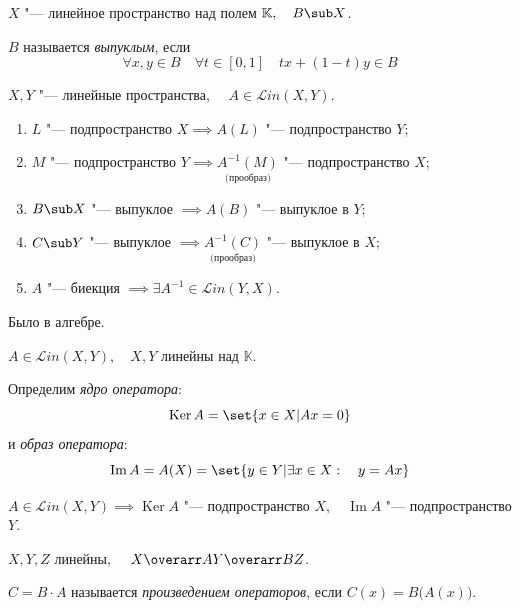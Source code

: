 \begin{definition}
	$ X $ "--- линейное пространство над полем $ \mathbb K, \quad B \sub X $.

	$ B $ называется \emph{выпуклым}, если
	$$ \forall x, y \in B \quad \forall t \in [0, 1] \quad tx + (1 - t)y \in B $$
\end{definition}

\begin{theorem}
	$ X, Y $ "--- линейные пространства, $ \quad A \in \mathscr Lin(X, Y) $.

	\begin{enumerate}
		\item $ L $ "--- подпространство $ X \implies A(L) $ "--- подпространство $ Y $;
		\item $ M $ "--- подпространство $ Y \implies
			\underset{\text{(прообраз)}}{A^{-1}(M)} $ "--- подпространство $ X $;
		\item $ B \sub X $ "--- выпуклое $ \implies A(B) $ "--- выпуклое в $ Y $;
		\item $ C \sub Y $ "--- выпуклое $ \implies \underset{\text{(прообраз)}}{A^{-1}(C)} $ "--- выпуклое в $ X $;
		\item $ A $ "--- биекция $ \implies \exists A^{-1} \in \mathscr Lin(Y, X) $.
	\end{enumerate}
\end{theorem}

\begin{noproof}
	Было в алгебре.
\end{noproof}

\begin{definition}
	$ A \in \mathscr Lin(X, Y), \quad X, Y $ линейны над $ \mathbb K $.

	Определим \emph{ядро оператора}:
	$$ \operatorname{Ker} A = \set{x \in X | Ax = 0} $$
	и \emph{образ оператора}:
	$$ \operatorname{Im} A = A(X) = \set{y \in Y | \exists x \in X : \quad y = Ax} $$
\end{definition}

\begin{implication}
	$ A \in \mathscr Lin(X, Y) \implies \operatorname{Ker} A $ "--- подпространство $ X, \quad \operatorname{Im} A $ "--- подпространство $ Y $.
\end{implication}

\begin{definition}
	$ X, Y, Z $ линейны, $ \quad X \overarr A Y \overarr B Z $.

	$ C = B \cdot A $ называется \emph{произведением операторов}, если $ C(x) = B \bigl( A(x) \bigr) $.
\end{definition}

